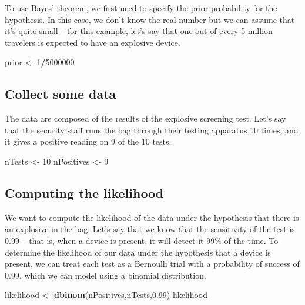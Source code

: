 \documentclass[]{book}
\newenvironment{Shaded}{\begin{snugshade}}{\end{snugshade}}
\newcommand{\KeywordTok}[1]{\textcolor[rgb]{0.13,0.29,0.53}{\textbf{#1}}}
\newcommand{\DecValTok}[1]{\textcolor[rgb]{0.00,0.00,0.81}{#1}}
\newcommand{\FloatTok}[1]{\textcolor[rgb]{0.00,0.00,0.81}{#1}}
\newcommand{\StringTok}[1]{\textcolor[rgb]{0.31,0.60,0.02}{#1}}
\newcommand{\OperatorTok}[1]{\textcolor[rgb]{0.81,0.36,0.00}{\textbf{#1}}}
\newcommand{\NormalTok}[1]{#1}
\theoremstyle{definition}
\theoremstyle{definition}
\theoremstyle{definition}
\theoremstyle{remark}
\begin{document}
To use Bayes' theorem, we first need to specify the prior probability
for the hypothesis. In this case, we don't know the real number but we
can assume that it's quite small -- for this example, let's say that one
out of every 5 million travelers is expected to have an explosive
device.

\begin{Shaded}
\begin{Highlighting}[]
\NormalTok{prior <-}\StringTok{ }\DecValTok{1}\OperatorTok{/}\DecValTok{5000000}
\end{Highlighting}
\end{Shaded}

\subsection{Collect some data}\label{collect-some-data}

The data are composed of the results of the explosive screening test.
Let's say that the security staff runs the bag through their testing
apparatus 10 times, and it gives a positive reading on 9 of the 10
tests.

\begin{Shaded}
\begin{Highlighting}[]
\NormalTok{nTests <-}\StringTok{ }\DecValTok{10}
\NormalTok{nPositives <-}\StringTok{ }\DecValTok{9}
\end{Highlighting}
\end{Shaded}

\subsection{Computing the likelihood}\label{computing-the-likelihood}

We want to compute the likelihood of the data under the hypothesis that
there is an explosive in the bag. Let's say that we know that the
sensitivity of the test is 0.99 -- that is, when a device is present, it
will detect it 99\% of the time. To determine the likelihood of our data
under the hypothesis that a device is present, we can treat each test as
a Bernoulli trial with a probability of success of 0.99, which we can
model using a binomial distribution.

\begin{Shaded}
\begin{Highlighting}[]
\NormalTok{likelihood <-}\StringTok{ }\KeywordTok{dbinom}\NormalTok{(nPositives,nTests,}\FloatTok{0.99}\NormalTok{)}
\NormalTok{likelihood}
\end{Highlighting}
\end{Shaded}
\end{document}
